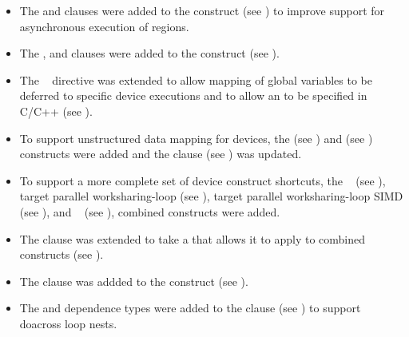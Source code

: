 \begin{itemize}
\item The  and  clauses were added to the
       construct (see )
      to improve support for asynchronous execution of  regions.

\item The ,  and  clauses
      were added to the  construct (see ).

\item The ~ directive was extended to allow
      mapping of global variables to be deferred to specific device
      executions and to allow an 
      to be specified in C/C++ (see ).

\item To support unstructured data mapping for devices, the
       (see ) and  (see ) constructs were added and the  clause
      (see ) was updated.

\item To support a more complete set of device construct shortcuts, the
      ~
      (see ),
      target parallel worksharing-loop
      (see ),
      target parallel worksharing-loop SIMD
      (see ),
      and ~
      (see ),
      combined constructs were added.

\item The  clause was extended to take a
       that allows it to apply
      to combined constructs (see ).

\item The  clause was addded to the  construct
      (see ).

\item The  and  dependence types were added to the
       clause (see ) to support
      doacross loop nests.


\end{itemize}
